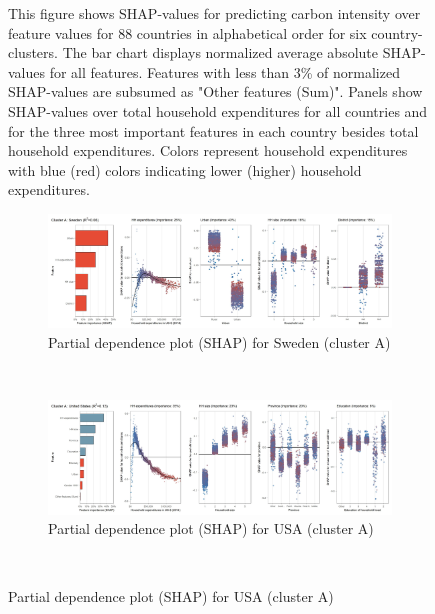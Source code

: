 \begin{figure}[ht!]
    \begin{subcaption2}
     This figure shows SHAP-values for predicting carbon intensity over feature values for 88 countries in alphabetical order for six country-clusters. The bar chart displays normalized average absolute SHAP-values for all features. Features with less than 3\% of normalized SHAP-values are subsumed as "Other features (Sum)". Panels show SHAP-values over total household expenditures for all countries and for the three most important features in each country besides total household expenditures. Colors represent household expenditures with blue (red) colors indicating lower (higher) household expenditures.
     \end{subcaption2}
\end{figure}

\begin{figure}[ht!]\ContinuedFloat
    \centering
   \begin{subfigure}[b]{\textwidth}
    \centering
         \caption{Partial dependence plot (SHAP) for Sweden (cluster A)}
         \label{fig:5b_SWE}
         \includegraphics[width=\textwidth]{Figure 5b/Figure_5b_SWE}
         \end{subfigure}
    \\
    \vspace{0.5cm}
    \begin{subfigure}[b]{\textwidth}
   \centering
         \caption{Partial dependence plot (SHAP) for USA (cluster A)}
         \label{fig:5b_USA}
         \includegraphics[width=\textwidth]{Figure 5b/Figure_5b_USA}   
         \end{subfigure}
    \\

\end{figure}
